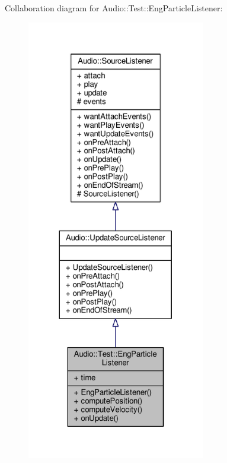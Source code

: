 Collaboration diagram for Audio\+:\+:Test\+:\+:Eng\+Particle\+Listener\+:
\nopagebreak
\begin{figure}[H]
\begin{center}
\leavevmode
\includegraphics[height=550pt]{d6/d60/classAudio_1_1Test_1_1EngParticleListener__coll__graph}
\end{center}
\end{figure}
